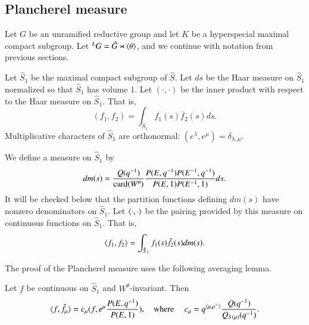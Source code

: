 \subsection{Plancherel measure}

Let $G$ be an unramified reductive group and let $K$ be a hyperspecial maximal compact subgroup.
Let ${}^LG = \hat G\rtimes \langle{\theta}\rangle$, and we continue with notation from previous sections.

Let $\hat S_1$ be the maximal compact subgroup of $\hat S$.  Let $ds$ be the Haar measure on $\hat S_1$ normalized
so that $\hat S_1$ has volume $1$.
Let $(\cdot,\cdot)$ be the inner product with respect to the Haar  measure on $\hat S_1$. That is,
\[
(f_1,f_2) = \int_{\hat S_1} f_1(s) \bar f_2(s) ds.
\]
Multiplicative characters of $\hat S_1$ are orthonormal: $(e^\lambda,e^\mu) = \delta_{\lambda,\mu}$.  


We define a measure on $\hat S_1$ by
\begin{equation}
dm(s) = \frac{Q(q^{-1})}{{\operatorname{card}}(W^\theta)}\frac{P(E,q^{-1}) P(E^{-1},q^{-1})}{P(E,1) P(E^{-1},1)} ds.
\end{equation}
It will be checked below that
the partition functions defining 
$dm(s)$
have nonzero  denominators on $\hat S_1$.
Let $\langle{\cdot,\cdot}\rangle$ be the pairing provided by this measure on continuous functions on $\hat S_1$.
That is, 
\[
\langle{f_1,f_2}\rangle = \int_{\hat S_1} f_1(s) \bar f_2(s) dm(s).
\]

The proof of the Plancherel measure uses the following averaging lemma.

\begin{lemma}\label{lemma:average} 
Let $f$ be continuous on $\hat S_1$ and $W^\theta$-invariant.
Then
\[
\langle{f,\hat f_\mu}\rangle = c_\mu  (f, e^\mu\frac{ P(E,q^{-1})}{P(E,1)}),
\quad\text{where }\quad
c_\mu = q^{\langle{\mu,\rho^\vee}\rangle}\frac{ Q(q^{-1})}{Q_{S(\mu)}(q^{-1})}.
\]
\end{lemma}

